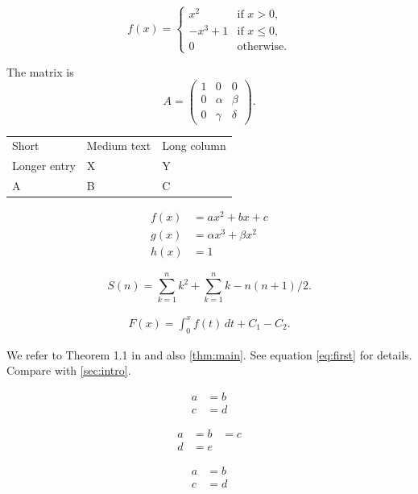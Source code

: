 \documentclass{amsart}
\begin{document}

\begin{equation}
f(x) =
\begin{cases}
x^2 & \text{if } x > 0, \\
-x^3 + 1 & \text{if } x \le 0, \\
0 & \text{otherwise}.
\end{cases}
\end{equation}

The matrix is
\[
A = \begin{pmatrix} 1 & 0 & 0 \\ 0 & \alpha & \beta \\ 0 & \gamma & \delta \end{pmatrix}.
\]

\begin{tabular}{lll}
Short & Medium text & Long column \\
Longer entry & X & Y \\
A & B & C
\end{tabular}

\begin{align*}
f(x) &= ax^2 + bx + c \\
g(x) &= \alpha x^3 + \beta x^2 \\
h(x) &= 1
\end{align*}


\begin{equation*}
S(n) = \sum_{k=1}^{n} k^2
+ \sum_{k=1}^{n} k
- n(n+1)/2.
\end{equation*}

\begin{gather*}
F(x) = \int_0^x f(t)\, dt
+ C_1
- C_2.
\end{gather*}


We refer to Theorem 1.1 in \cite{ref1} and also \ref{thm:main}.
See equation \eqref{eq:first} for details.
Compare with \cref{sec:intro}.


\begin{align*}
a &= b \\
c &= d
\end{align*}


\begin{align*}
a &= b &= c \\
d &= e
\end{align*}

\begin{align*}
a &= b \\ %
c &= d
\end{align*}
\end{document}

